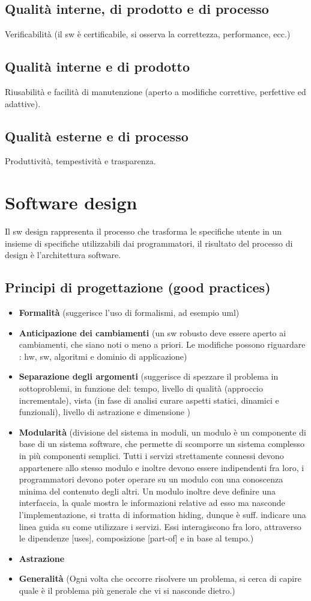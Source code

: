 \documentclass[a4paper,12pt]{report}
\begin{document}
	\subsection{Qualità interne, di prodotto e di processo}
	Verificabilità (il sw è certificabile, si osserva la correttezza, performance, ecc.)
	\subsection{Qualità interne e di prodotto}
	Riusabilità e facilità di manutenzione (aperto a modifiche correttive, perfettive ed adattive).
	\subsection{Qualità esterne e di processo}
	Produttività, tempestività e trasparenza.	
	\section{Software design}
	Il sw design rappresenta il processo che trasforma le specifiche utente in un insieme di specifiche utilizzabili dai programmatori, il risultato del processo di design è l'architettura software.
	\subsection{Principi di progettazione (good practices)}
	\begin{itemize}
		\item \textbf{Formalità }(suggerisce l'uso di formalismi, ad esempio uml)
		\item \textbf{Anticipazione dei cambiamenti} (un sw robusto deve essere aperto ai cambiamenti, che siano noti o meno a priori. Le modifiche possono riguardare : hw, sw, algoritmi e dominio di applicazione)
		\item \textbf{Separazione degli argomenti} (suggerisce di spezzare il problema in sottoproblemi, in funzione del: tempo, livello di qualità (approccio incrementale), vista (in fase di analisi curare aspetti statici, dinamici e funzionali), livello di astrazione e dimensione )
		\item \textbf{Modularità} (divisione del sistema in moduli, un modulo è un componente di base di un sistema software, che permette di scomporre un sistema complesso in più componenti semplici. Tutti i servizi strettamente connessi devono appartenere allo stesso modulo e inoltre devono essere indipendenti fra loro, i programmatori devono poter operare su un modulo con una conoscenza minima del contenuto degli altri. Un modulo inoltre deve definire una interfaccia, la quale mostra le informazioni relative ad esso ma nasconde l'implementazione, si tratta di information hiding, dunque è suff. indicare una linea guida su come utilizzare i servizi. Essi interagiscono fra loro, attraverso le dipendenze [uses], composizione [part-of] e in base al tempo.)
		\item \textbf{Astrazione}
		\item \textbf{Generalità} (Ogni volta che occorre risolvere un problema, si cerca di capire quale è il problema più generale che vi si nasconde dietro.)
	\end{itemize}
\end{document}
